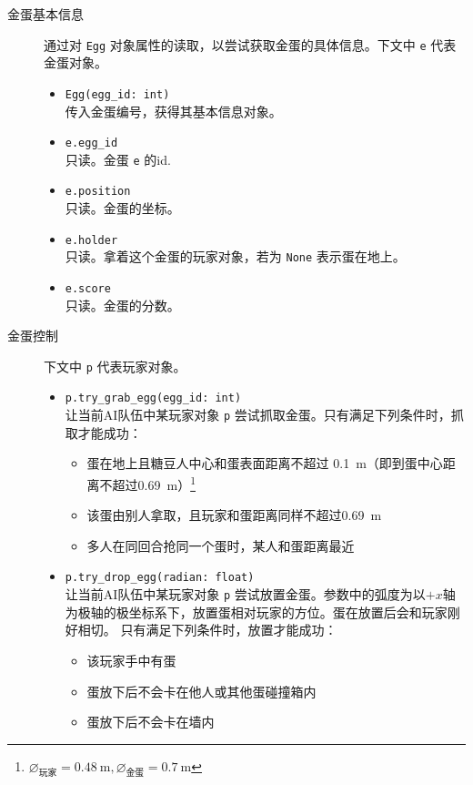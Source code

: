 \documentclass{article}
\begin{document}
\begin{description}
\begin{itemize}
\end{itemize}

\item[金蛋基本信息] 通过对 \lstinline{Egg} 对象属性的读取，以尝试获取金蛋的具体信息。下文中 \lstinline{e} 代表金蛋对象。

\begin{itemize}
\item
\lstinline{Egg(egg_id: int)}\\[-2pt]
传入金蛋编号，获得其基本信息对象。

\item \lstinline{e.egg_id}\\[-2pt]
只读。金蛋 \lstinline{e} 的id.

\item \lstinline{e.position}\\[-2pt]
只读。金蛋的坐标。

\item \lstinline{e.holder}\\[-2pt]
只读。拿着这个金蛋的玩家对象，若为 \lstinline{None} 表示蛋在地上。

\item \lstinline{e.score}\\[-2pt]
只读。金蛋的分数。
\end{itemize}

\item[金蛋控制] 下文中 \lstinline{p} 代表玩家对象。

\begin{itemize}

\item
\lstinline{p.try_grab_egg(egg_id: int)}\\[-2pt]
让当前AI队伍中某玩家对象 \lstinline{p} 尝试抓取金蛋。只有满足下列条件时，抓取才能成功：
\begin{itemize}\setlength\itemsep{0em}
\item 蛋在地上且糖豆人中心和蛋表面距离不超过 \SI{0.1}{\meter}（即到蛋中心距离不超过\SI{0.69}{\meter}）\footnote{$\diameter_{\text{玩家}}=\SI{0.48}{\meter},\diameter_{\text{金蛋}}=\SI{0.7}{\meter}$}
\item 该蛋由别人拿取，且玩家和蛋距离同样不超过\SI{0.69}{\meter}
\item 多人在同回合抢同一个蛋时，某人和蛋距离最近
\end{itemize}

\item
\lstinline{p.try_drop_egg(radian: float)}\\[-2pt]
让当前AI队伍中某玩家对象 \lstinline{p} 尝试放置金蛋。参数中的弧度为以$+x$轴为极轴的极坐标系下，放置蛋相对玩家的方位。蛋在放置后会和玩家刚好相切。
只有满足下列条件时，放置才能成功：
	\begin{itemize}\setlength\itemsep{0em}
	\item 该玩家手中有蛋
	\item 蛋放下后不会卡在他人或其他蛋碰撞箱内
	\item 蛋放下后不会卡在墙内
	\end{itemize}
\end{itemize}

\end{description}
\end{document}

